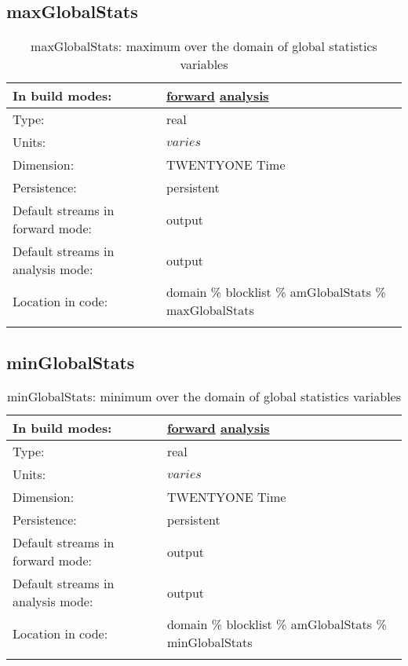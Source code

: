 \subsection[maxGlobalStats]{maxGlobalStats}
\label{subsec:var_sec_amGlobalStats_maxGlobalStats}
\begin{center}
\begin{longtable}{| p{2.0in} | p{4.0in} |}
        \hline 
        In build modes: & \hyperref[subsec:forward_var_tab_amGlobalStats]{forward} \hyperref[subsec:analysis_var_tab_amGlobalStats]{analysis} \\
        \hline 
        Type: & real \\
        \hline 
        Units: & $varies$ \\
        \hline 
        Dimension: & TWENTYONE Time \\
        \hline 
        Persistence: & persistent \\
        \hline 
		 Default streams in forward mode: &  output \\
        \hline 
		 Default streams in analysis mode: &  output \\
        \hline 
		 Location in code: & domain \% blocklist \% amGlobalStats \% maxGlobalStats \\
		 \hline 
    \caption{maxGlobalStats: maximum over the domain of global statistics variables}
\end{longtable}
\end{center}
\subsection[minGlobalStats]{minGlobalStats}
\label{subsec:var_sec_amGlobalStats_minGlobalStats}
\begin{center}
\begin{longtable}{| p{2.0in} | p{4.0in} |}
        \hline 
        In build modes: & \hyperref[subsec:forward_var_tab_amGlobalStats]{forward} \hyperref[subsec:analysis_var_tab_amGlobalStats]{analysis} \\
        \hline 
        Type: & real \\
        \hline 
        Units: & $varies$ \\
        \hline 
        Dimension: & TWENTYONE Time \\
        \hline 
        Persistence: & persistent \\
        \hline 
		 Default streams in forward mode: &  output \\
        \hline 
		 Default streams in analysis mode: &  output \\
        \hline 
		 Location in code: & domain \% blocklist \% amGlobalStats \% minGlobalStats \\
		 \hline 
    \caption{minGlobalStats: minimum over the domain of global statistics variables}
\end{longtable}
\end{center}
